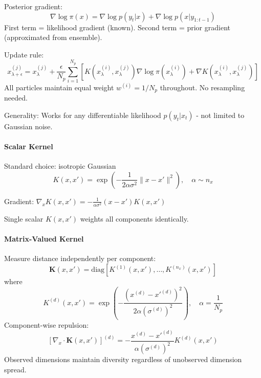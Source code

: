 \documentclass{article}
\begin{document}
Posterior gradient:
\begin{equation}
\nabla \log \pi(x) = \nabla \log p(y_t | x) + \nabla \log p(x | y_{1:t-1})
\end{equation}
First term = likelihood gradient (known). Second term = prior gradient (approximated from ensemble).

Update rule:
\begin{equation}
x_{\lambda+\epsilon}^{(j)} = x_\lambda^{(j)} + \frac{\epsilon}{N_p} \sum_{i=1}^{N_p} \left[K(x^{(i)}_\lambda, x^{(j)}_\lambda)\nabla \log \pi(x^{(i)}_\lambda) + \nabla K(x^{(i)}_\lambda, x^{(j)}_\lambda)\right]
\end{equation}
All particles maintain equal weight $w^{(i)} = 1/N_p$ throughout. No resampling needed.

Generality: Works for any differentiable likelihood $p(y_t | x_t)$ - not limited to Gaussian noise.
\paragraph{Scalar Kernel}

Standard choice: isotropic Gaussian
\begin{equation}
K(x,x') = \exp\left(-\frac{1}{2\alpha\sigma^2}\|x-x'\|^2\right), \quad \alpha \sim n_x
\end{equation}

Gradient: $\nabla_x K(x,x') = -\frac{1}{\alpha\sigma^2}(x-x') K(x,x')$

Single scalar $K(x,x')$ weights all components identically.

\paragraph{Matrix-Valued Kernel}

Measure distance independently per component:
\begin{equation}
\mathbf{K}(x,x') = \text{diag}\left[K^{(1)}(x,x'), \ldots, K^{(n_x)}(x,x')\right]
\end{equation}
where
\begin{equation}
K^{(d)}(x,x') = \exp\left(-\frac{(x^{(d)} - x'^{(d)})^2}{2\alpha (\sigma^{(d)})^2}\right), \quad \alpha = \frac{1}{N_p}
\end{equation}
Component-wise repulsion:
\begin{equation}
\left[\nabla_x \cdot \mathbf{K}(x,x')\right]^{(d)} = -\frac{x^{(d)} - x'^{(d)}}{\alpha (\sigma^{(d)})^2} K^{(d)}(x,x')
\end{equation}
Observed dimensions maintain diversity regardless of unobserved dimension spread.
\end{document}
